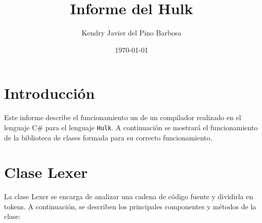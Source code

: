 \documentclass{article}
\title{Informe del Hulk}
\author{Kendry Javier del Pino Barbosa}
\date{\today}
\begin{document}
\maketitle

\section{Introducción}
Este informe describe el funcionamiento un de un compilador realizado en el lenguaje C\# para el lenguaje \lstinline{Hulk}. A continuación se mostrará el funcionamiento de la biblioteca de clases formada para su correcto funcionamiento. 
\section{Clase \textcolor{classcolor}{Lexer}}
La clase \textcolor{classcolor}{Lexer} se encarga de analizar una cadena de código fuente y dividirla en tokens. A continuación, se describen los principales componentes y métodos de la clase:
\end{document}
